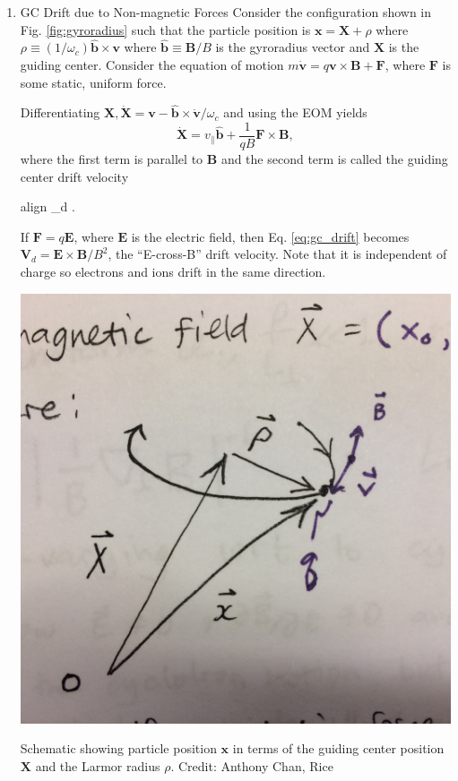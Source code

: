 	\begin{enumerate}

		\item{GC Drift due to Non-magnetic Forces} 
		Consider the configuration shown in Fig. \ref{fig:gyroradius} such that the particle position is $\mathbf{x}=\mathbf{X}+\rho$ where $\rho\equiv(1/\omega_c)\hat{\mathbf{b}}\times\mathbf{v}$ where $\hat{\mathbf{b}}\equiv\mathbf{B}/B$ is the gyroradius vector and $\mathbf{X}$ is the guiding center. Consider the equation of motion $m\dot{\mathbf{v}} = q\mathbf{v}\times\mathbf{B}+\mathbf{F}$, where $\mathbf{F}$ is some static, uniform force.

		Differentiating $\mathbf{X},\dot{\mathbf{X}}=\mathbf{v} - \hat{\mathbf{b}}\times\dot{\mathbf{v}}/\omega_c$ and using the EOM yields 
		\begin{equation}
			\dot{\mathbf{X}}= v_{\parallel}\hat{\mathbf{b}} + \frac{1}{qB}\mathbf{F}\times\mathbf{B},
		\end{equation}
		where the first term is parallel to $\mathbf{B}$ and the second term is called the guiding center drift velocity
		\begin{empheq}[box=\widefbox]{align}
			\label{eq:gc_drift}
			_d \equiv {}\times{}.
		\end{empheq}
		If $\mathbf{F} = q\mathbf{E}$, where $\mathbf{E}$ is the electric field, then Eq. \ref{eq:gc_drift} becomes $\mathbf{V}_d = \mathbf{E}\times\mathbf{B}/B^2$, the ``E-cross-B'' drift velocity. Note that it is independent of charge so electrons and ions drift in the same direction.
		\begin{marginfigure}
			\centering
			\includegraphics[width=\columnwidth]{figures/gyroradius_schematic.jpeg}
			\caption{Schematic showing particle position $\mathbf{x}$ in terms of the guiding center position $\mathbf{X}$ and the Larmor radius $\rho$. Credit: Anthony Chan, Rice}
			\label{fig:gyroradius}
		\end{marginfigure}


\end{enumerate}
